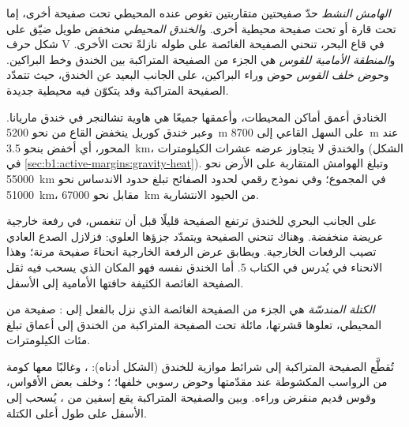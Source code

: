 \begin{definition}\label{def:b1:active-margins:active-margin}
\emph{الهامش النشط} حدّ صفيحتين متقاربتين تغوص عنده  المحيطي تحت صفيحة أخرى، إما تحت قارة أو تحت صفيحة محيطية أخرى. و\emph{الخندق المحيطي} منخفض طويل ضيّق على شكل حرف V في قاع البحر، تنحني الصفيحة الغائصة على طوله نازلةً تحت الأخرى. و\emph{المنطقة الأمامية للقوس} هي الجزء من الصفيحة المتراكبة بين الخندق وخط البراكين. و\emph{حوض خلف القوس} حوض وراء البراكين، على الجانب البعيد عن الخندق، حيث تتمدّد الصفيحة المتراكبة وقد يتكوّن فيه  محيطية جديدة.
\end{definition}

الخنادق أعمق أماكن المحيطات، وأعمقها جميعًا هي هاوية تشالنجر في خندق ماريانا. وعبر خندق كوريل ينخفض القاع من نحو \qty{5200}{m} على السهل القاعي إلى \qty{8700}{m} عند المحور، أي أخفض بنحو \qty{3.5}{km}، والخندق لا يتجاوز عرضه عشرات الكيلومترات (الشكل في \cref{sec:b1:active-margins:gravity-heat}). وتبلغ الهوامش المتقاربة على الأرض نحو \qty{55000}{km} في المجموع؛ وفي نموذج رقمي لحدود الصفائح تبلغ حدود الاندساس نحو \qty{51000}{km}، مقابل نحو \qty{67000}{km} من الحيود الانتشارية.

على الجانب البحري للخندق ترتفع الصفيحة قليلًا قبل أن تنغمس، في رفعة خارجية عريضة منخفضة. وهناك تنحني الصفيحة ويتمدّد جزؤها العلوي: فزلازل الصدع العادي تصيب الرفعات الخارجية. ويطابق عرض الرفعة الخارجية انحناءَ صفيحة مرنة؛ وهذا الانحناء في  يُدرس في الكتاب 5. أما الخندق نفسه فهو المكان الذي يسحب فيه ثقل الصفيحة الغائصة الكثيفة حافتها الأمامية إلى الأسفل.

\begin{definition}\label{def:b1:active-margins:slab}
\emph{الكتلة المندسّة} هي الجزء من الصفيحة الغائصة الذي نزل بالفعل إلى : صفيحة من  المحيطي، تعلوها قشرتها، مائلة تحت الصفيحة المتراكبة من الخندق إلى أعماق تبلغ مئات الكيلومترات.
\end{definition}

تُقطَّع الصفيحة المتراكبة إلى شرائط موازية للخندق (الشكل أدناه): ، وغالبًا معها كومة من الرواسب المكشوطة عند مقدّمتها وحوض رسوبي خلفها؛ ؛ وخلف بعض الأقواس،  وقوس قديم منقرض وراءه. وبين  والصفيحة المتراكبة يقع إسفين من ، يُسحب إلى الأسفل على طول أعلى الكتلة.

